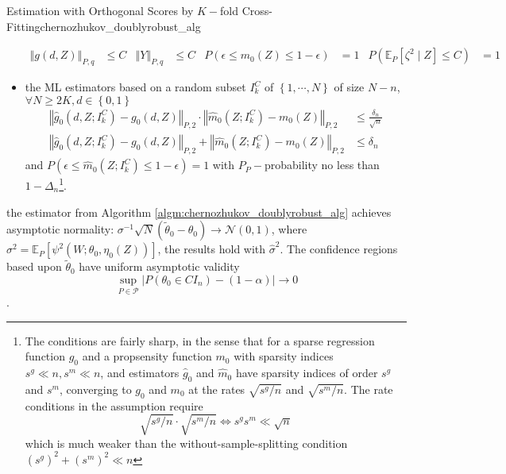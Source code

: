 \documentclass[twoside]{article}
\begin{document}
\begin{algorithm}{Estimation with Orthogonal Scores by $K-$fold Cross-Fitting}{chernozhukov_doublyrobust_alg}
\begin{itemize}
        \begin{align*}
            \left\Vert g(d,Z) \right\Vert _{P,q} &\leq C & \left\Vert Y \right\Vert _{P,q} &\leq C & P\left(\epsilon \leq m_0 (Z) \leq 1-\epsilon\right) &=1 & P\left(\mathbb{E}_P\left[\zeta^2\mid Z\right]\leq C\right)&=1 
        \end{align*}
        \item the ML estimators based on a random subset $I^C_k$ of $\left\{1,\cdots,N\right\}$ of size $N-n$, $\forall N\geq 2K, d\in\left\{0,1\right\}$
        \begin{align*}
            \left\Vert \hat{g}_0\left(d,Z;I^C_k\right)-g_0(d,Z) \right\Vert _{P,2}\cdot \left\Vert \hat{m}_0\left(Z;I^C_k\right) -m_0(Z) \right\Vert _{P,2} &\leq \frac{\delta_n}{\sqrt{n}} \\
            \left\Vert \hat{g}_0\left(d,Z;I^C_k\right)-g_0(d,Z) \right\Vert _{P,2} + \left\Vert \hat{m}_0\left(Z;I^C_k\right) -m_0(Z) \right\Vert _{P,2} &\leq \delta_n
        \end{align*}
        and $P\left(\epsilon\leq \hat{m}_0\left(Z;I^C_k\right)\leq 1-\epsilon\right)=1$ with $P_P-$probability no less than $1-\Delta_n$\footnote{The conditions are fairly sharp, in the sense that for a sparse regression function $g_0$ and a propsensity function $m_0$ with sparsity indices $s^g\ll n,s^m\ll n$, and estimators $\hat{g}_0$ and $\hat{m}_0$ have sparsity indices of order $s^g$ and $s^m$, converging to $g_0$ and $m_0$ at the rates $\sqrt{s^g/n}$ and $\sqrt{s^m/n}$. The rate conditions in the assumption require $$ \sqrt{s^g/n} \cdot \sqrt{s^m/n} \Leftrightarrow s^gs^m\ll \sqrt{n} $$ which is much weaker than the without-sample-splitting condition $\left(s^g\right)^2 + \left(s^m\right)^2\ll n$}.
    \end{itemize}
\end{algorithm}

the estimator from Algorithm \ref{algm:chernozhukov_doublyrobust_alg} achieves asymptotic normality:
$\sigma^{-1}\sqrt{N}\left(\tilde{\theta}_0-\theta_0\right) \rightarrow \mathcal{N}\left(0,1\right)$, where $\sigma^2 = \mathbb{E}_P\left[\psi^2\left(W;\theta_0,\eta_0\left(Z\right)\right)\right]$, the results hold with $\hat{\sigma}^2$. The confidence regions based upon $\tilde{\theta}_0$ have uniform asymptotic validity $$ \sup_{P\in \mathcal{P}}\left\vert P\left(\theta_0\in CI_n\right)-\left(1-\alpha\right) \right\vert \rightarrow 0$$.
\end{document}
